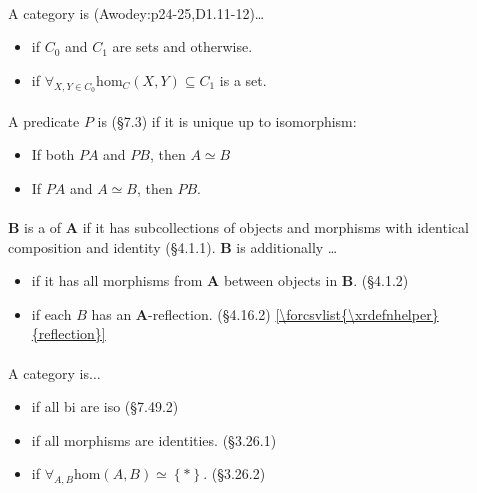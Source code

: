 \documentclass[10pt,twocolumn,letterpaper]{article}
\newcommand{\set}[1]{\left\{{#1}\right\}}
\newcommand\xrdefnhelper[1]{defn:#1}
\newcommand{\xrdefn}[1]{\ref{\forcsvlist{\xrdefnhelper}{#1}}}
\begin{document}
  \paragraph{}
  A category is (Awodey:p24-25,D1.11-12)\dots
    \begin{itemize}
      \item {} if $C_0$ and $C_1$ are sets and  otherwise.
      \item {} if $\forall_{X,Y \in C_0} \mbox{hom}_C(X,Y) \subseteq C_1$ is a set.
    \end{itemize}

  \paragraph{}
  A predicate $P$ is  (\S7.3) if it is unique up to
  isomorphism:
  \begin{itemize}
    \item If both $PA$ and $PB$, then $A \simeq B$
    \item If $PA$ and $A \simeq B$, then $PB$.
  \end{itemize}

  \paragraph{}
  $\mathbf{B}$ is a  of $\mathbf{A}$ if it has
  subcollections of objects and morphisms with identical composition and
  identity (\S4.1.1).  $\mathbf{B}$ is additionally \dots
  \begin{itemize}
	\item {} if it has all morphisms from $\mathbf{A}$
	      between objects in $\mathbf{B}$. (\S4.1.2) 
	\item {} if each $B$ has an $\mathbf{A}$-reflection. (\S4.16.2)
	      \xrdefn{reflection}
  \end{itemize}

  \paragraph{}
  A category is$\dots$
  \begin{itemize}
    \item {} if all bi are iso (\S7.49.2)
    \item {} if all morphisms are identities. (\S3.26.1)
    \item {} if $\forall_{A,B} \mbox{hom}(A,B) \simeq \set{*}$. (\S3.26.2)
  \end{itemize}
\end{document}
